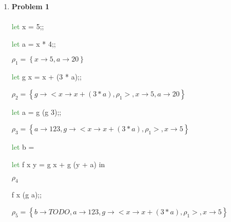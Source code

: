
\usepackage{algorithm}
\usepackage{listings}
\usepackage{graphicx,amssymb,amsmath}
\usepackage{epstopdf}
\usepackage{color}
\usepackage[dvipsnames]{xcolor}
\sloppy

\oddsidemargin 0in
\evensidemargin 0in
\textwidth 6.5in
\topmargin -0.5in
\textheight 9.0in




\pagestyle{myheadings}  %
	 	
\begin{enumerate}	
\item{\bf{Problem 1}} \\ \\
\textcolor{ForestGreen}{let} x = 5;;

\textcolor{ForestGreen}{let} a = x * 4;;

\(\rho_1 = \left\{ x \rightarrow 5, a \rightarrow 20 \right\} \)

\textcolor{ForestGreen}{let} g x = x + (3 * a);; 

\(\rho_2 = \left\{ g \rightarrow  < x \rightarrow x + (3 * a), \rho_1>, x \rightarrow 5, a \rightarrow 20 \right\} \)

\textcolor{ForestGreen}{let} a = g (g 3);;

\(\rho_3 = \left\{ a \rightarrow 123, g \rightarrow  < x \rightarrow x + (3 * a), \rho_1>, x \rightarrow 5 \right\}  \)

\textcolor{ForestGreen}{let} b =

\hspace{5mm} \textcolor{ForestGreen}{let} f x y = g x + g (y + a) in 

\(\rho_4\)

\hspace{5mm} f x (g a);;

\(\rho_5 =  \left\{ b \rightarrow TODO, a \rightarrow 123, g \rightarrow  < x \rightarrow x + (3 * a), \rho_1>, x \rightarrow 5 \right\}  \)

\end{enumerate}



